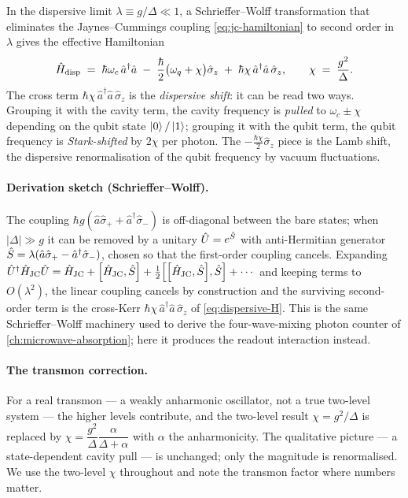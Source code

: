 \begin{statement}
\label{stmt:dispersive-H}
In the dispersive limit $\lambda\equiv g/\Delta\ll1$, a
Schrieffer--Wolff transformation that eliminates the
Jaynes--Cummings coupling \cref{eq:jc-hamiltonian} to second order
in $\lambda$ gives the effective Hamiltonian
\begin{equation}
\label{eq:dispersive-H}
\hat{H}_{\rm disp} \;=\; \hbar\omega_c\,\hat a^\dagger\hat a
\;-\; \frac{\hbar}{2}\bigl(\omega_q + \chi\bigr)\hat\sigma_z
\;+\; \hbar\chi\,\hat a^\dagger\hat a\,\hat\sigma_z,
\qquad
\chi \;=\; \frac{g^2}{\Delta}.
\end{equation}
The cross term $\hbar\chi\,\hat a^\dagger\hat a\,\hat\sigma_z$ is the
\emph{dispersive shift}: it can be read two ways. Grouping it with
the cavity term, the cavity frequency is \emph{pulled} to
$\omega_c\pm\chi$ depending on the qubit state $\ket0/\ket1$;
grouping it with the qubit term, the qubit frequency is
\emph{Stark-shifted} by $2\chi$ per photon. The $-\tfrac{\hbar\chi}{2}\hat\sigma_z$
piece is the Lamb shift, the dispersive renormalisation of the
qubit frequency by vacuum fluctuations.
\end{statement}

\paragraph{Derivation sketch (Schrieffer--Wolff).}
The coupling $\hbar g(\hat a\hat\sigma_+ + \hat a^\dagger\hat\sigma_-)$
is off-diagonal between the bare states; when $|\Delta|\gg g$ it can
be removed by a unitary $\hat{U}=e^{\hat{S}}$ with anti-Hermitian
generator $\hat{S}=\lambda(\hat a\hat\sigma_+-\hat a^\dagger\hat\sigma_-)$,
chosen so that the first-order coupling cancels. Expanding
$\op U^\dagger\op H_{\rm JC}\op U=\op H_{\rm JC}+\comm{\op H_{\rm JC}}{\op S}+\tfrac12\comm{\comm{\op H_{\rm JC}}{\op S}}{\op S}+\cdots$
and keeping terms to $O(\lambda^2)$, the linear coupling cancels by
construction and the surviving second-order term is the cross-Kerr
$\hbar\chi\,\hat a^\dagger\hat a\,\hat\sigma_z$ of
\cref{eq:dispersive-H}. This is the same Schrieffer--Wolff machinery
used to derive the four-wave-mixing photon counter of
\cref{ch:microwave-absorption}; here it produces the readout
interaction instead.

\paragraph{The transmon correction.}
For a real transmon --- a weakly anharmonic oscillator, not a true
two-level system --- the higher levels contribute, and the
two-level result $\chi=g^2/\Delta$ is replaced by
$\chi=\dfrac{g^2}{\Delta}\dfrac{\alpha}{\Delta+\alpha}$ with
$\alpha$ the anharmonicity. The qualitative picture --- a
state-dependent cavity pull --- is unchanged; only the magnitude is
renormalised. We use the two-level $\chi$ throughout and note the
transmon factor where numbers matter.

